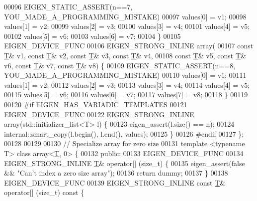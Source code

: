 \begin{DoxyCode}
00096     EIGEN\_STATIC\_ASSERT(n==7, YOU\_MADE\_A\_PROGRAMMING\_MISTAKE)
00097     values[0] = v1;
00098     values[1] = v2;
00099     values[2] = v3;
00100     values[3] = v4;
00101     values[4] = v5;
00102     values[5] = v6;
00103     values[6] = v7;
00104   \}
00105   EIGEN\_DEVICE\_FUNC
00106   EIGEN\_STRONG\_INLINE array(
00107       \textcolor{keyword}{const} \hyperlink{group___sparse_core___module_class_eigen_1_1_triplet}{T}& v1, \textcolor{keyword}{const} \hyperlink{group___sparse_core___module_class_eigen_1_1_triplet}{T}& v2, \textcolor{keyword}{const} \hyperlink{group___sparse_core___module_class_eigen_1_1_triplet}{T}& v3, \textcolor{keyword}{const} \hyperlink{group___sparse_core___module_class_eigen_1_1_triplet}{T}& v4,
00108       \textcolor{keyword}{const} \hyperlink{group___sparse_core___module_class_eigen_1_1_triplet}{T}& v5, \textcolor{keyword}{const} \hyperlink{group___sparse_core___module_class_eigen_1_1_triplet}{T}& v6, \textcolor{keyword}{const} \hyperlink{group___sparse_core___module_class_eigen_1_1_triplet}{T}& v7, \textcolor{keyword}{const} \hyperlink{group___sparse_core___module_class_eigen_1_1_triplet}{T}& v8) \{
00109     EIGEN\_STATIC\_ASSERT(n==8, YOU\_MADE\_A\_PROGRAMMING\_MISTAKE)
00110     values[0] = v1;
00111     values[1] = v2;
00112     values[2] = v3;
00113     values[3] = v4;
00114     values[4] = v5;
00115     values[5] = v6;
00116     values[6] = v7;
00117     values[7] = v8;
00118   \}
00119 
00120 \textcolor{preprocessor}{#if EIGEN\_HAS\_VARIADIC\_TEMPLATES}
00121   EIGEN\_DEVICE\_FUNC
00122   EIGEN\_STRONG\_INLINE array(std::initializer\_list<T> l) \{
00123     eigen\_assert(l.size() == n);
00124     internal::smart\_copy(l.begin(), l.end(), values);
00125   \}
00126 \textcolor{preprocessor}{#endif}
00127 \};
00128 
00129 
00130 \textcolor{comment}{// Specialize array for zero size}
00131 \textcolor{keyword}{template} <\textcolor{keyword}{typename} T> \textcolor{keyword}{class }array<\hyperlink{group___sparse_core___module_class_eigen_1_1_triplet}{T}, 0> \{
00132  \textcolor{keyword}{public}:
00133   EIGEN\_DEVICE\_FUNC
00134   EIGEN\_STRONG\_INLINE \hyperlink{group___sparse_core___module_class_eigen_1_1_triplet}{T}& operator[] (\textcolor{keywordtype}{size\_t}) \{
00135     eigen\_assert(\textcolor{keyword}{false} && \textcolor{stringliteral}{"Can't index a zero size array"});
00136     \textcolor{keywordflow}{return} dummy;
00137   \}
00138   EIGEN\_DEVICE\_FUNC
00139   EIGEN\_STRONG\_INLINE \textcolor{keyword}{const} \hyperlink{group___sparse_core___module_class_eigen_1_1_triplet}{T}& operator[] (\textcolor{keywordtype}{size\_t})\textcolor{keyword}{ const }\{

\end{DoxyCode}
